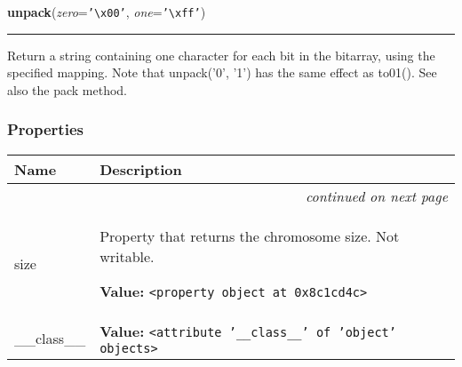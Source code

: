     \label{bitarray:_bitarray:unpack}

    \vspace{0.5ex}

    \begin{boxedminipage}{\textwidth}

    \raggedright \textbf{unpack}(\textit{zero}=\texttt{'{\textbackslash}x00'}, \textit{one}=\texttt{'{\textbackslash}xff'})

    \vspace{-1.5ex}

    \rule{\textwidth}{0.5\fboxrule}

Return a string containing one character for each bit in the bitarray,
using the specified mapping.
Note that unpack('0', '1') has the same effect as to01().
See also the pack method.
    \vspace{1ex}

    \end{boxedminipage}



  \subsubsection{Properties}

\begin{longtable}{|p{}|p{}|l}
\cline{1-2}
\cline{1-2} \centering \textbf{Name} & \centering \textbf{Description}& \\
\cline{1-2}
\endhead\cline{1-2}\multicolumn{3}{r}{\small\textit{continued on next page}}\\\endfoot\cline{1-2}
\endlastfoot\raggedright s\-i\-z\-e\- & \raggedright Property that returns the chromosome size. Not writable.

\textbf{Value:} 
{\tt {\textless}property object at 0x8c1cd4c{\textgreater}}&\\
\cline{1-2}
\raggedright \_\-\_\-c\-l\-a\-s\-s\-\_\-\_\- & \raggedright \textbf{Value:} 
{\tt {\textless}attribute '\_\_class\_\_' of 'object' objects{\textgreater}}&\\
\cline{1-2}
\end{longtable}



